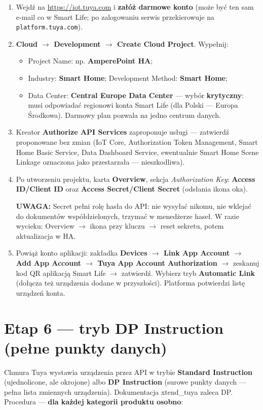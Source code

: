 \documentclass[11pt,a4paper]{article}
\newcommand{\uwaga}[1]{\par\medskip\noindent\textcolor{warnred}{\textbf{UWAGA:}} #1\par\medskip}
\begin{document}
\begin{enumerate}
\item Wejdź na \url{https://iot.tuya.com} i \textbf{załóż darmowe konto} (może być ten sam e-mail co w Smart Life; po zalogowaniu serwis przekierowuje na \texttt{platform.tuya.com}).
\item \textbf{Cloud $\to$ Development $\to$ Create Cloud Project}. Wypełnij:
  \begin{itemize}
  \item Project Name: np. \textbf{AmperePoint HA};
  \item Industry: \textbf{Smart Home}; Development Method: \textbf{Smart Home};
  \item Data Center: \textbf{Central Europe Data Center} --- wybór \textbf{krytyczny}: musi odpowiadać regionowi konta Smart Life (dla Polski --- Europa Środkowa). Darmowy plan pozwala na jedno centrum danych.
  \end{itemize}
\item Kreator \textbf{Authorize API Services} zaproponuje usługi --- zatwierdź proponowane bez zmian (IoT Core, Authorization Token Management, Smart Home Basic Service, Data Dashboard Service, ewentualnie Smart Home Scene Linkage oznaczona jako przestarzała --- nieszkodliwa).
\item Po utworzeniu projektu, karta \textbf{Overview}, sekcja \emph{Authorization Key}: \textbf{Access ID/Client ID} oraz \textbf{Access Secret/Client Secret} (odsłania ikona oka). \uwaga{Secret pełni rolę hasła do API: nie wysyłać nikomu, nie wklejać do dokumentów współdzielonych, trzymać w menedżerze haseł. W razie wycieku: Overview $\to$ ikona przy kluczu $\to$ reset sekretu, potem aktualizacja w HA.}
\item Powiąż konto aplikacji: zakładka \textbf{Devices $\to$ Link App Account $\to$ Add App Account $\to$ Tuya App Account Authorization} $\to$ zeskanuj kod QR aplikacją Smart Life $\to$ zatwierdź. Wybierz tryb \textbf{Automatic Link} (dołącza też urządzenia dodane w przyszłości). Platforma potwierdzi listę urządzeń konta.
\end{enumerate}

\section{Etap 6 --- tryb DP Instruction (pełne punkty danych)}
\label{sec:etap6}

Chmura Tuya wystawia urządzenia przez API w trybie \textbf{Standard Instruction} (ujednolicone, ale okrojone) albo \textbf{DP Instruction} (surowe punkty danych --- pełna lista zmiennych urządzenia). Dokumentacja xtend\_tuya zaleca DP. Procedura --- \textbf{dla każdej kategorii produktu osobno}:
\end{document}
